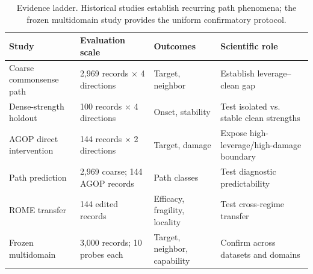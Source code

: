 \begin{table}[t]
\centering
\small
\caption{Evidence ladder. Historical studies establish recurring path phenomena;
the frozen multidomain study provides the uniform confirmatory protocol.}
\label{tab:study-map}
\begin{tabular}{p{}p{}p{}p{}}
\toprule
Study & Evaluation scale & Outcomes & Scientific role \\
\midrule
Coarse commonsense path & 2,969 records $\times$ 4 directions & Target, neighbor & Establish leverage--clean gap \\
Dense-strength holdout & 100 records $\times$ 4 directions & Onset, stability & Test isolated vs. stable clean strengths \\
AGOP direct intervention & 144 records $\times$ 2 directions & Target, damage & Expose high-leverage/high-damage boundary \\
Path prediction & 2,969 coarse; 144 AGOP records & Path classes & Test diagnostic predictability \\
ROME transfer & 144 edited records & Efficacy, fragility, locality & Test cross-regime transfer \\
Frozen multidomain & 3,000 records; 10 probes each & Target, neighbor, capability & Confirm across datasets and domains \\
\bottomrule
\end{tabular}
\end{table}
